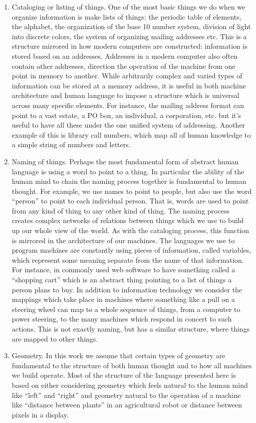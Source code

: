 \begin{enumerate}
\def\labelenumi{\arabic{enumi}.}
\item
  Cataloging or listing of things. One of the most basic things we do
  when we organize information is make lists of things: the periodic
  table of elements, the alphabet, the organization of the base 10
  number system, division of light into discrete colors, the system of
  organizing mailing addresses etc. This is a structure mirrored in how
  modern computers are constructed: information is stored based on an
  addresses. Addresses in a modern computer also often contain other
  addresses, direction the operation of the machine from one point in
  memory to another. While arbitrarily complex and varied types of
  information can be stored at a memory address, it is useful in both
  machine architecture and human language to impose a structure which is
  universal across many specific elements. For instance, the mailing
  address format can point to a vast estate, a PO box, an individual, a
  corporation, etc. but it's useful to have all these under the one
  unified system of addressing. Another example of this is library call
  numbers, which map all of human knowledge to a simple string of
  numbers and letters.
\item
  Naming of things. Perhaps the most fundamental form of abstract human
  language is using a word to point to a thing. In particular the
  ability of the human mind to chain the naming process together is
  fundamental to human thought. For example, we use names to point to
  people, but also use the word ``person'' to point to each individual
  person. That is, words are used to point from any kind of thing to any
  other kind of thing. The naming process creates complex networks of
  relations between things which we use to build up our whole view of
  the world. As with the cataloging process, this function is mirrored
  in the architecture of our machines. The languages we use to program
  machines are constantly using pieces of information, called variables,
  which represent some meaning separate from the name of that
  information. For instance, in commonly used web software to have
  something called a ``shopping cart'' which is an abstract thing
  pointing to a list of things a person plans to buy. In addition to
  information technology we consider the mappings which take place in
  machines where something like a pull on a steering wheel can map to a
  whole sequence of things, from a computer to power steering, to the
  many machines which respond in concert to such actions. This is not
  exactly naming, but has a similar structure, where things are mapped
  to other things.
\item
  Geometry. In this work we assume that certain types of geometry are
  fundamental to the structure of both human thought and to how all
  machines we build operate. Most of the structure of the language
  presented here is based on either considering geometry which feels
  natural to the human mind like ``left'' and ``right'' and geometry
  natural to the operation of a machine like ``distance between plants''
  in an agricultural robot or distance between pixels in a display.
\end{enumerate}

